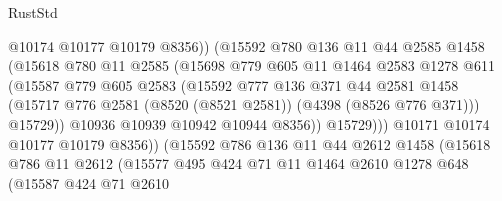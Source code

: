 \begin{lexlean}{RustStd}
\begin{coremodule}
                              @10174
                              @10177
                              @10179
                              @8356))
                          (@15592
                            @780
                            @136
                            @11
                            @44
                            @2585
                            @1458
                            (@15618
                              @780
                              @11
                              @2585
                              (@15698
                                @779
                                @605
                                @11
                                @1464
                                @2583
                                @1278
                                @611
                                (@15587
                                  @779
                                  @605
                                  @2583
                                  (@15592
                                    @777
                                    @136
                                    @371
                                    @44
                                    @2581
                                    @1458
                                    (@15717
                                      @776
                                      @2581
                                      (@8520 (@8521 @2581))
                                      (@4398 (@8526 @776 @371)))
                                    @15729))
                                @10936
                                @10939
                                @10942
                                @10944
                                @8356))
                            @15729)))
                      @10171
                      @10174
                      @10177
                      @10179
                      @8356))
                  (@15592
                    @786
                    @136
                    @11
                    @44
                    @2612
                    @1458
                    (@15618
                      @786
                      @11
                      @2612
                      (@15577
                        @495
                        @424
                        @71
                        @11
                        @1464
                        @2610
                        @1278
                        @648
                        (@15587
                          @424
                          @71
                          @2610

\end{coremodule}
\end{lexlean}
